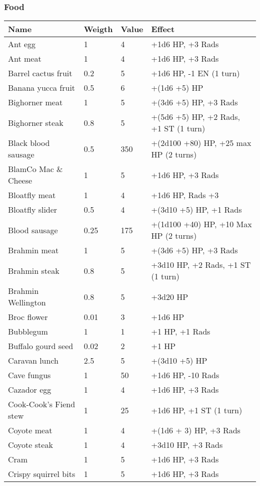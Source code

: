 


\subsubsection{Food}
\begin{longtable}{|p{4cm}|p{1.5cm}|p{1.5cm}|p{9cm}|}
\hline
\bfseries Name & \bfseries Weigth & \bfseries Value & \bfseries Effect \\
\hline
\endhead
Ant egg & 1 & 4 & +1d6 HP, +3 Rads \\
Ant meat & 1 & 4 & +1d6 HP, +3 Rads \\
Barrel cactus fruit & 0.2 & 5 & +1d6 HP, -1 EN (1 turn) \\
Banana yucca fruit & 0.5 & 6 & +(1d6 +5) HP \\
Bighorner meat & 1 & 5 & +(3d6 +5) HP, +3 Rads \\
Bighorner steak & 0.8 & 5 & +(5d6 +5) HP, +2 Rads, +1 ST (1 turn) \\
Black blood sausage & 0.5 & 350 & +(2d100 +80) HP, +25 max HP (2 turns) \\
BlamCo Mac \& Cheese & 1 & 5 & +1d6 HP, +3 Rads \\
Bloatfly meat & 1 & 4 & +1d6 HP, Rads +3 \\
Bloatfly slider & 0.5 & 4 & +(3d10 +5) HP, +1 Rads \\
Blood sausage & 0.25 & 175 & +(1d100 +40) HP, +10 Max HP (2 turns) \\
Brahmin meat & 1 & 5 & +(3d6 +5) HP, +3 Rads \\
Brahmin steak & 0.8 & 5 & +3d10 HP, +2 Rads, +1 ST (1 turn) \\
Brahmin Wellington & 0.8 & 5 & +3d20 HP \\
Broc flower & 0.01 & 3 & +1d6 HP \\
Bubblegum & 1 & 1 & +1 HP, +1 Rads \\
Buffalo gourd seed & 0.02 & 2 & +1 HP \\
Caravan lunch & 2.5 & 5 & +(3d10 +5) HP \\
Cave fungus & 1 & 50 & +1d6 HP, -10 Rads \\
Cazador egg & 1 & 4 & +1d6 HP, +3 Rads \\
Cook-Cook's Fiend stew & 1 & 25 & +1d6 HP, +1 ST (1 turn) \\
Coyote meat & 1 & 4 & +(1d6 + 3) HP, +3 Rads \\
Coyote steak & 1 & 4 & +3d10 HP, +3 Rads \\
Cram & 1 & 5 & +1d6 HP, +3 Rads \\
Crispy squirrel bits & 1 & 5 & +1d6 HP, +3 Rads \\

\end{longtable}
